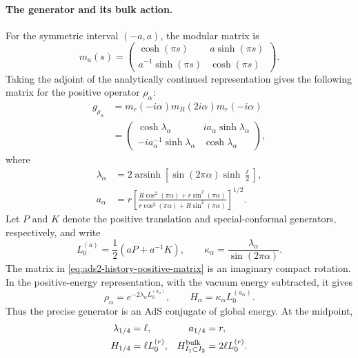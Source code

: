 \documentclass[a4paper,11pt]{article}
\theoremstyle{definition}
\begin{document}
\paragraph{The generator and its bulk action.}
For the symmetric interval $(-a,a)$, the modular matrix is
\begin{equation}
 m_a(s)=
 \begin{pmatrix}
  \cosh(\pi s)&a\sinh(\pi s)\\
  a^{-1}\sinh(\pi s)&\cosh(\pi s)
 \end{pmatrix}.
\end{equation}
Taking the adjoint of the analytically continued representation gives
the following matrix for the positive operator $\rho_\alpha$:
\begin{equation}
 \begin{aligned}
 g_{\rho_\alpha}
 &=m_r(-i\alpha)m_R(2i\alpha)m_r(-i\alpha)\\
 &=\begin{pmatrix}
  \cosh\lambda_\alpha&i a_\alpha\sinh\lambda_\alpha\\
  -i a_\alpha^{-1}\sinh\lambda_\alpha&\cosh\lambda_\alpha
 \end{pmatrix},
 \end{aligned}
 \label{eq:ads2-history-positive-matrix}
\end{equation}
where
\begin{equation}
 \begin{aligned}
 \lambda_\alpha
 &=2\operatorname{arsinh}
   \left[\sin(2\pi\alpha)\sinh\frac{\ell}{2}\right],\\
 a_\alpha
 &=r\left[
 \frac{R\cos^2(\pi\alpha)+r\sin^2(\pi\alpha)}
      {r\cos^2(\pi\alpha)+R\sin^2(\pi\alpha)}
 \right]^{1/2}.
 \end{aligned}
 \label{eq:ads2-history-parameters}
\end{equation}
Let $P$ and $K$ denote the positive translation and special-conformal
generators, respectively, and write
\begin{equation}
 L_0^{(a)}=\frac12\left(aP+a^{-1}K\right),
 \qquad
 \kappa_\alpha=\frac{\lambda_\alpha}{\sin(2\pi\alpha)}.
\end{equation}
The matrix in \eqref{eq:ads2-history-positive-matrix} is an imaginary
compact rotation. In the positive-energy representation, with the
vacuum energy subtracted, it gives
\begin{equation}
 \boxed{
 \rho_\alpha=e^{-2\lambda_\alpha L_0^{(a_\alpha)}},
 \qquad H_\alpha=\kappa_\alpha L_0^{(a_\alpha)}.
 }
 \label{eq:ads2-history-H}
\end{equation}
Thus the precise generator is an AdS conjugate of global energy. At
the midpoint,
\begin{equation}
 \begin{aligned}
 \lambda_{1/4}&=\ell,
 & a_{1/4}&=r,\\
 H_{1/4}&=\ell L_0^{(r)},
 & H^{\rm bulk}_{I_1\subset I_2}&=2\ell L_0^{(r)}.
 \end{aligned}
 \label{eq:ads2-history-midpoint}
\end{equation}
\end{document}
